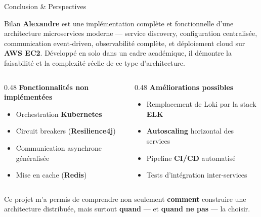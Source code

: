 \documentclass[aspectratio=169]{beamer}
\begin{document}
\begin{frame}{Conclusion \& Perspectives}

  \begin{block}{\faTrophy\quad Bilan}
    \small \textbf{Alexandre} est une implémentation complète et fonctionnelle d'une
    architecture microservices moderne — service discovery, configuration centralisée,
    communication event-driven, observabilité complète, et déploiement cloud sur
    \textbf{AWS EC2}. Développé en solo dans un cadre académique, il démontre la
    faisabilité et la complexité réelle de ce type d'architecture.
  \end{block}

  \vspace{0.4em}

  \begin{columns}[T]
    \begin{column}{0.48\textwidth}
      \textbf{\color{primary}\small Fonctionnalités non implémentées}
      \begin{itemize}\small
        \item Orchestration \textbf{Kubernetes}
        \item Circuit breakers (\textbf{Resilience4j})
        \item Communication asynchrone généralisée
        \item Mise en cache (\textbf{Redis})
      \end{itemize}
    \end{column}
    \begin{column}{0.48\textwidth}
      \textbf{\color{primary}\small Améliorations possibles}
      \begin{itemize}\small
        \item Remplacement de Loki par la stack \textbf{ELK}
        \item \textbf{Autoscaling} horizontal des services
        \item Pipeline \textbf{CI/CD} automatisé
        \item Tests d'intégration inter-services
      \end{itemize}
    \end{column}
  \end{columns}

  \vspace{0.4em}

  \begin{alertblock}{}
    \centering\small
    Ce projet m'a permis de comprendre non seulement \textbf{comment} construire
    une architecture distribuée, mais surtout \textbf{quand} — et \textbf{quand
    ne pas} — la choisir.
  \end{alertblock}

\end{frame}

\end{document}
